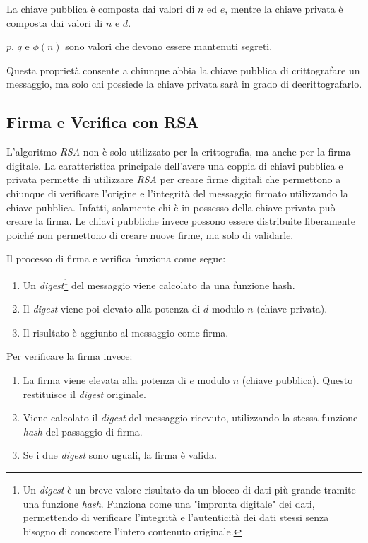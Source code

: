 La chiave pubblica è composta dai valori di $n$ ed $e$, mentre la chiave privata è composta dai valori di $n$ e $d$.

$p$, $q$ e $\phi(n)$ sono valori che devono essere mantenuti segreti.

Questa proprietà consente a chiunque abbia la chiave pubblica di crittografare un messaggio, ma solo chi possiede la chiave privata sarà in grado di decrittografarlo.

\subsection{Firma e Verifica con RSA}
\label{sec:rsassa}

L'algoritmo \emph{RSA} non è solo utilizzato per la crittografia, ma anche per la firma digitale.
La caratteristica principale dell'avere una coppia di chiavi pubblica e privata permette di utilizzare \emph{RSA} per creare firme digitali che permettono a chiunque di verificare l'origine e l'integrità del messaggio firmato utilizzando la chiave pubblica.
Infatti, solamente chi è in possesso della chiave privata può creare la firma.
Le chiavi pubbliche invece possono essere distribuite liberamente poiché non permettono di creare nuove firme, ma solo di validarle.

\noindent Il processo di firma e verifica funziona come segue:
\begin{enumerate}
	\item Un \emph{digest}\footnote{Un \emph{digest} è un breve valore risultato da un blocco di dati più grande tramite una funzione \emph{hash}. Funziona come una "impronta digitale" dei dati, permettendo di verificare l'integrità e l'autenticità dei dati stessi senza bisogno di conoscere l'intero contenuto originale.} del messaggio viene calcolato da una funzione hash.
	\item Il \emph{digest} viene poi elevato alla potenza di $d$ modulo $n$ (chiave privata).
	\item Il risultato è aggiunto al messaggio come firma.
\end{enumerate}
\noindent Per verificare la firma invece:
\begin{enumerate}
	\item La firma viene elevata alla potenza di $e$ modulo $n$ (chiave pubblica). Questo restituisce il \emph{digest} originale.
	\item Viene calcolato il \emph{digest} del messaggio ricevuto, utilizzando la stessa funzione \emph{hash} del passaggio di firma.
	\item Se i due \emph{digest} sono uguali, la firma è valida.
\end{enumerate}

